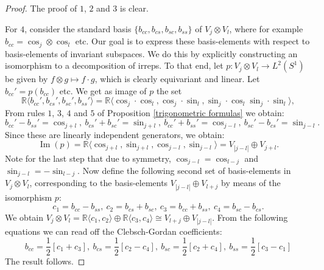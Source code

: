 \documentclass[12pt, a4paper]{article}
\theoremstyle{plain}
\theoremstyle{definition}
\theoremstyle{remark}
\newcommand{\R}{\mathds{R}}
\DeclareMathOperator{\im}{Im}
\begin{document}
\begin{proof}
The proof of $1$, $2$ and $3$ is clear.

For $4$, consider the standard basis $\{b_{cc}, b_{cs}, b_{sc}, b_{ss}\}$ of $V_{j} \otimes V_l$, where for example $b_{cc} = \cos_j \otimes \cos_l$ etc. Our goal is to express these basis-elements with respect to basis-elements of invariant subspaces. We do this by explicitly constructing an isomorphism to a decomposition of irreps. To that end, let $p: V_j \otimes V_l \to L^2\left(S^1\right)$ be given by $f \otimes g \mapsto f \cdot g$, which is clearly equivariant and linear. Let $b_{cc}' = p(b_{cc})$ etc. We get as image of $p$ the set
\begin{equation*}
\R \langle b_{cc}', b_{cs}', b_{sc}', b_{ss}' \rangle  = \R\langle \cos_j \cdot \cos_l, \cos_j \cdot \sin_l, \sin_j \cdot \cos_l \sin_j \cdot \sin_l\rangle,
\end{equation*}
From rules $1$, $3$, $4$ and $5$ of Proposition \ref{trigonometric formulas} we obtain:
\begin{equation*}
b_{cc}' - b_{ss}' = \cos_{j+l}, \ b_{cs}' + b_{sc}' = \sin_{j+l}, \ b_{cc}' + b_{ss}' = \cos_{j-l}, \ b_{sc}' - b_{cs}' = \sin_{j-l}.
\end{equation*}
Since these are linearly independent generators, we obtain:
\begin{equation*}
\im(p) = \R \langle \cos_{j+l}, \sin_{j+l}, \cos_{j-l}, \sin_{j-l}\rangle = V_{|j-l|} \oplus V_{j+l} .
\end{equation*}
Note for the last step that due to symmetry, $\cos_{j-l} = \cos_{l-j}$ and $\sin_{j-l} = - \sin_{l-j}$. Now define the following second set of basis-elements in $V_j \otimes V_l$, corresponding to the basis-elements $V_{|j-l|} \oplus V_{l+j}$ by means of the isomorphism $p$:
\begin{equation*}
c_1 = b_{cc} - b_{ss}, \ c_2 = b_{cs} + b_{sc}, \  c_3 = b_{cc} + b_{ss}, \  c_{4} = b_{sc} - b_{cs}.
\end{equation*}
We obtain $V_j \otimes V_l = \R\langle c_1, c_2\rangle \oplus \R\langle c_3, c_4\rangle \cong V_{l+j} \oplus V_{|j-l|}$. From the following equations we can read off the Clebsch-Gordan coefficients:
\begin{equation*}
b_{cc} = \frac{1}{2} \left[ c_1 + c_3\right], \  b_{cs} = \frac{1}{2} \left[ c_2 - c_4\right], \  b_{sc} = \frac{1}{2} \left[ c_2 + c_4 \right], \  b_{ss} = \frac{1}{2} \left[ c_3 - c_1\right]
\end{equation*}
The result follows.


\end{proof}
\end{document}
